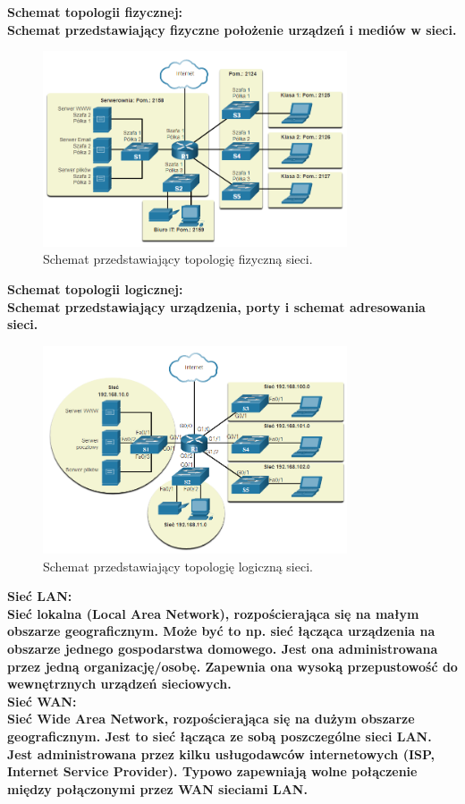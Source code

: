 \documentclass[a4paper,12pt]{article}
\newcommand{\h}[1]{\noindent \bf #1 \rm \\ \noindent}
\begin{document}
\h{Schemat topologii fizycznej:}
Schemat przedstawiający fizyczne położenie urządzeń i mediów w sieci.
\begin{figure}[H]
	\centering
	\includegraphics[width=9cm]{fig5.png}
	\caption{Schemat przedstawiający topologię fizyczną sieci.}
\end{figure}

\h{Schemat topologii logicznej:}
Schemat przedstawiający urządzenia, porty i schemat adresowania sieci.
\begin{figure}[H]
	\centering
	\includegraphics[width=9cm]{fig6.png}
	\caption{Schemat przedstawiający topologię logiczną sieci.}
\end{figure}
\vspace{5mm}

\h{Sieć LAN:}
Sieć lokalna (Local Area Network), rozpościerająca się na małym obszarze geograficznym. Może być to np. sieć łącząca urządzenia na obszarze jednego gospodarstwa domowego. Jest ona administrowana przez jedną organizację/osobę. Zapewnia ona wysoką przepustowość do wewnętrznych urządzeń sieciowych.\\

\h{Sieć WAN:}
Sieć Wide Area Network, rozpościerająca się na dużym obszarze geograficznym. Jest to sieć łącząca ze sobą poszczególne sieci LAN. Jest administrowana przez kilku usługodawców internetowych (ISP, Internet Service Provider). Typowo zapewniają wolne połączenie między połączonymi przez WAN sieciami LAN.\\
\end{document}
